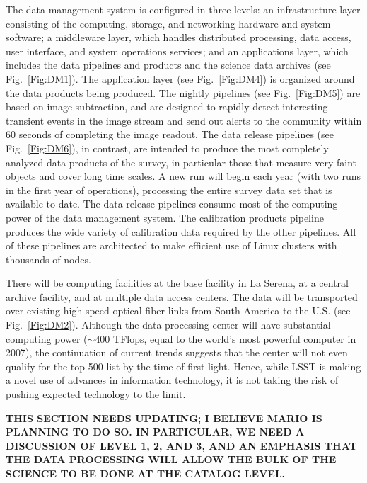 \documentclass{emulateapj}
\begin{document}
The data management system is configured in three levels: an
infrastructure layer consisting of the computing, storage, and
networking hardware and system software; a middleware layer, which
handles distributed processing, data access, user interface, and
system operations services; and an applications layer, which includes
the data pipelines and products and the science data archives (see
Fig.~\ref{Fig:DM1}). The application layer (see Fig.~\ref{Fig:DM4})
is organized around the data products being produced.  The nightly
pipelines (see Fig.~\ref{Fig:DM5}) are based on image subtraction,
and are designed to rapidly detect interesting transient events in the
image stream and send out alerts to the community within 60 seconds of
completing the image readout.  The data release
pipelines (see Fig.~\ref{Fig:DM6}), in contrast, are intended to
produce the most completely analyzed data products of the survey, in
particular those that measure very faint objects and cover long time
scales. A new run will begin each year (with two runs in the first
year of operations), processing the entire survey data
set that is available to date. The data release pipelines consume most of the
computing power of the data management system.  The calibration
products pipeline produces the wide variety of calibration data
required by the other pipelines.  All of these pipelines are
architected to make efficient use of Linux clusters with thousands of
nodes.

There will be computing facilities at the base facility in La Serena,
at a central archive facility, and at multiple data access 
centers. The data will be transported over existing high-speed optical fiber 
links from South America to the U.S. (see Fig.~\ref{Fig:DM2}).
Although the data processing center will have substantial computing power ($\sim$400 
TFlops, equal to the world's most powerful computer in 2007), the continuation of 
current trends suggests that the center will 
not even qualify for the top 500 list by the time of first light.
Hence, while LSST is making a novel use of advances in information technology, 
it is not taking the risk of pushing expected technology to the limit.  

{\bf THIS SECTION NEEDS UPDATING; I BELIEVE MARIO IS PLANNING TO DO
  SO.  IN PARTICULAR, WE NEED A DISCUSSION OF LEVEL 1, 2, AND 3, AND
  AN EMPHASIS THAT THE DATA PROCESSING WILL ALLOW THE BULK OF THE
  SCIENCE TO BE DONE AT THE CATALOG LEVEL.}
\end{document}
